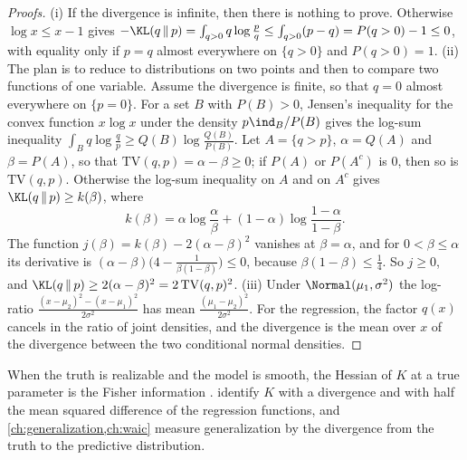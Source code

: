 \begin{refsection}
\begin{proof}[Proofs]
(i) If the divergence is infinite, then there is nothing to prove. Otherwise $\log x\le x-1$ gives $-\KL(q\,\|\,p)=\int_{q>0}q\log\frac pq\le\int_{q>0}(p-q)=P(q>0)-1\le0$, with equality only if $p=q$ almost everywhere on $\{q>0\}$ and $P(q>0)=1$.
(ii) The plan is to reduce to distributions on two points and then to compare two functions of one variable. Assume the divergence is finite, so that $q=0$ almost everywhere on $\{p=0\}$. For a set $B$ with $P(B)>0$, Jensen's inequality for the convex function $x\log x$ under the density $p\ind_B/P(B)$ gives the log-sum inequality $\int_Bq\log\frac qp\ge Q(B)\log\frac{Q(B)}{P(B)}$. Let $A=\{q>p\}$, $\alpha=Q(A)$ and $\beta=P(A)$, so that $\mathrm{TV}(q,p)=\alpha-\beta\ge0$; if $P(A)$ or $P(A^c)$ is $0$, then so is $\mathrm{TV}(q,p)$. Otherwise the log-sum inequality on $A$ and on $A^c$ gives $\KL(q\,\|\,p)\ge k(\beta)$, where
\[
k(\beta)=\alpha\log\frac\alpha\beta+(1-\alpha)\log\frac{1-\alpha}{1-\beta}.
\]
The function $j(\beta)=k(\beta)-2(\alpha-\beta)^2$ vanishes at $\beta=\alpha$, and for $0<\beta\le\alpha$ its derivative is $(\alpha-\beta)\bigl(4-\frac1{\beta(1-\beta)}\bigr)\le0$, because $\beta(1-\beta)\le\frac14$. So $j\ge0$, and $\KL(q\,\|\,p)\ge2(\alpha-\beta)^2=2\,\mathrm{TV}(q,p)^2$.
(iii) Under $\Normal(\mu_1,\sigma^2)$ the log-ratio $\frac{(x-\mu_2)^2-(x-\mu_1)^2}{2\sigma^2}$ has mean $\frac{(\mu_1-\mu_2)^2}{2\sigma^2}$. For the regression, the factor $q(x)$ cancels in the ratio of joint densities, and the divergence is the mean over $x$ of the divergence between the two conditional normal densities.
\end{proof}

When the truth is realizable and the model is smooth, the Hessian of $K$ at a true parameter is the Fisher information \parencite[p.~872]{Watanabe2013}.  identify $K$ with a divergence and with half the mean squared difference of the regression functions, and \cref{ch:generalization,ch:waic} measure generalization by the divergence from the truth to the predictive distribution.


\end{refsection}
